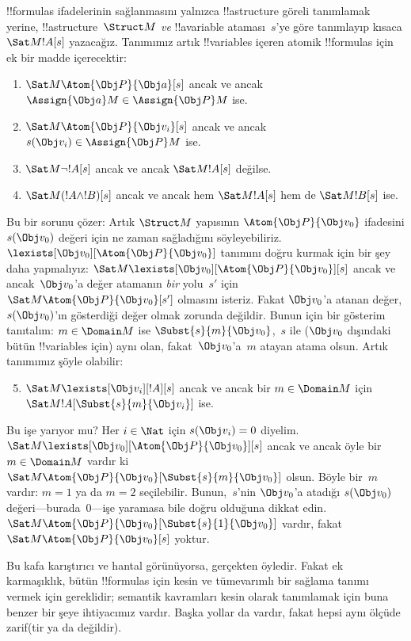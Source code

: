 \documentclass[../../../include/open-logic-section]{subfiles}
\begin{document}
!!{formula}s ifadelerinin sağlanmasını yalnızca !!a{structure}
göreli tanımlamak yerine, !!a{structure}~$\Struct M$ \emph{ve}
!!a{variable} ataması~$s$'ye göre tanımlayıp kısaca
$\Sat M{!A}[s]$ yazacağız. Tanımımız artık !!{variable}s içeren atomik
!!{formula}s için ek bir madde içerecektir:
\begin{enumerate}
  \item $\Sat M{\Atom{\Obj P}{\Obj a}}[s]$ ancak ve ancak
  $\Assign{\Obj a}M\in\Assign{\Obj P}M$ ise.
  \item $\Sat M{\Atom{\Obj P}{\Obj v_i}}[s]$ ancak ve ancak
  $s(\Obj v_i)\in\Assign{\Obj P}M$ ise.
  \item $\Sat M{\lnot !A}[s]$ ancak ve ancak $\Sat M{!A}[s]$ değilse.
  \item $\Sat M{(!A\land !B)}[s]$ ancak ve ancak hem
  $\Sat M{!A}[s]$ hem de $\Sat M{!B}[s]$ ise.
\end{enumerate}
Bu bir sorunu çözer: Artık $\Struct M$ yapısının
$\Atom{\Obj P}{\Obj v_0}$ ifadesini $s(\Obj v_0)$ değeri için ne zaman
sağladığını söyleyebiliriz. $\lexists[\Obj v_0][\Atom{\Obj P}{\Obj
v_0}]$ tanımını doğru kurmak için bir şey daha yapmalıyız:
$\Sat M{\lexists[\Obj v_0][\Atom{\Obj P}{\Obj v_0}]}[s]$ ancak ve
ancak~$\Obj v_0$'a değer atamanın \emph{bir} yolu~$s'$ için
$\Sat M{\Atom{\Obj P}{\Obj v_0}}[s']$ olmasını isteriz. Fakat
$\Obj v_0$'a atanan değer, $s(\Obj v_0)$'ın gösterdiği değer olmak
zorunda değildir. Bunun için bir gösterim tanıtalım: $m\in\Domain M$
ise $\Subst{s}{m}{\Obj v_0}$,~$s$ ile ($\Obj v_0$ dışındaki bütün
!!{variable}s için) aynı olan, fakat~$\Obj v_0$'a~$m$ atayan atama
olsun. Artık tanımımız şöyle olabilir:
\begin{enumerate}\setcounter{enumi}{4}
  \item $\Sat M{\lexists[\Obj v_i][!A]}[s]$ ancak ve ancak bir
  $m\in\Domain M$ için $\Sat M{!A}[\Subst{s}{m}{\Obj v_i}]$ ise.
\end{enumerate}
Bu işe yarıyor mu? Her $i\in\Nat$ için $s(\Obj v_i)=0$ diyelim.
$\Sat M{\lexists[\Obj v_0][\Atom{\Obj P}{\Obj v_0}]}[s]$ ancak ve
ancak öyle bir $m\in\Domain M$ vardır ki
$\Sat M{\Atom{\Obj P}{\Obj v_0}}[\Subst{s}{m}{\Obj v_0}]$ olsun.
Böyle bir~$m$ vardır: $m=1$ ya da $m=2$ seçilebilir. Bunun,~$s$'nin
$\Obj v_0$'a atadığı $s(\Obj v_0)$ değeri---burada~$0$---işe yaramasa
bile doğru olduğuna dikkat edin.
$\Sat M{\Atom{\Obj P}{\Obj v_0}}[\Subst{s}{1}{\Obj v_0}]$ vardır,
fakat $\Sat M{\Atom{\Obj P}{\Obj v_0}}[s]$ yoktur.

Bu kafa karıştırıcı ve hantal görünüyorsa, gerçekten öyledir. Fakat ek
karmaşıklık, bütün !!{formula}s için kesin ve tümevarımlı bir sağlama
tanımı vermek için gereklidir; semantik kavramları kesin olarak
tanımlamak için buna benzer bir şeye ihtiyacımız vardır. Başka yollar
da vardır, fakat hepsi aynı ölçüde zarif(tir ya da değildir).
\end{document}
